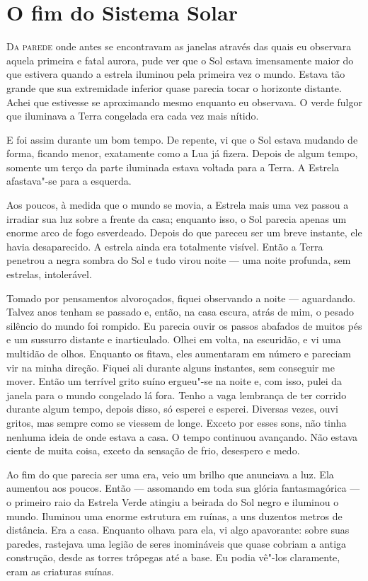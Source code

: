 \clearpage

\chapter{O fim do Sistema Solar}

\textsc{Da parede} onde antes se encontravam as janelas através das quais eu observara aquela primeira e fatal aurora, pude ver
que o Sol estava imensamente maior do que estivera quando a estrela iluminou pela primeira vez o mundo. Estava tão
grande que sua extremidade inferior quase parecia tocar o horizonte distante. Achei que estivesse se aproximando mesmo
enquanto eu observava. O verde fulgor que iluminava a Terra congelada era cada vez mais nítido.

E foi assim durante um bom tempo. De repente, vi que o Sol estava mudando de forma, ficando menor, exatamente como a
Lua já fizera. Depois de algum tempo, somente um terço da parte iluminada estava voltada para a Terra. A
Estrela afastava"-se para a esquerda.

Aos poucos, à medida que o mundo se movia, a Estrela mais uma vez passou a irradiar sua luz sobre a frente da casa;
enquanto isso, o Sol parecia apenas um enorme arco de fogo esverdeado. Depois do que pareceu ser um breve instante, ele
havia desaparecido. A estrela ainda era totalmente visível. Então a Terra penetrou a negra sombra do Sol e tudo virou
noite --- uma noite profunda, sem estrelas, intolerável.

Tomado por pensamentos alvoroçados, fiquei observando a noite --- aguardando. Talvez anos tenham se passado e, então, na
casa escura, atrás de mim, o pesado silêncio do mundo foi rompido. Eu parecia ouvir os passos abafados de muitos pés e
um sussurro distante e inarticulado. Olhei em volta, na escuridão, e vi uma multidão de olhos. Enquanto os fitava, eles
aumentaram em número e pareciam vir na minha direção. Fiquei ali durante alguns instantes, sem conseguir me
mover. Então um terrível grito suíno ergueu"-se na noite e, com isso, pulei da janela para o mundo congelado lá
fora. Tenho a vaga lembrança de ter corrido durante algum tempo, depois disso, só esperei e esperei. Diversas vezes,
ouvi gritos, mas sempre como se viessem de longe. Exceto por esses sons, não tinha nenhuma ideia de onde estava a casa.
O tempo continuou avançando. Não estava ciente de muita coisa, exceto da sensação de frio, desespero e medo.

Ao fim do que parecia ser uma era, veio um brilho que anunciava a luz. Ela aumentou aos poucos. Então --- assomando em
toda sua glória fantasmagórica --- o primeiro raio da Estrela Verde atingiu a beirada do Sol negro e iluminou o mundo.
Iluminou uma enorme estrutura em ruínas, a uns duzentos metros de distância. Era a casa. Enquanto olhava para ela, vi
algo apavorante: sobre suas paredes, rastejava uma legião de seres inomináveis que quase cobriam a antiga construção,
desde as torres trôpegas até a base. Eu podia vê"-los claramente, eram as criaturas suínas.

